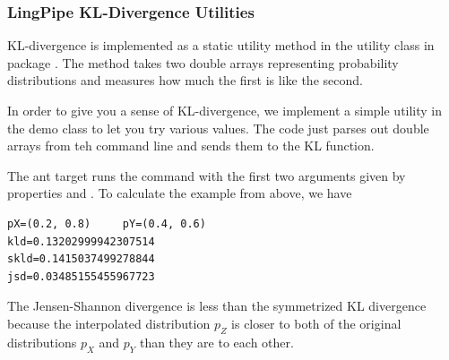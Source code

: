 \subsubsection{LingPipe KL-Divergence Utilities}

KL-divergence is implemented as a static utility method in the
 utility class in package .
The method takes two double arrays representing probability
distributions and measures how much the first is like the second.

In order to give you a sense of KL-divergence, we implement a simple
utility in the demo class  to let you try various
values.  The code just parses out double arrays from teh command line
and sends them to the KL function.
%

The ant target  runs the command with the first two arguments
given by properties  and .  To calculate the example
from above, we have
%
\begin{verbatim}
pX=(0.2, 0.8)     pY=(0.4, 0.6)     
kld=0.13202999942307514    
skld=0.1415037499278844   
jsd=0.03485155455967723
\end{verbatim}
%
The Jensen-Shannon divergence is less than the symmetrized KL
divergence because the interpolated distribution $p_Z$ is closer to
both of the original distributions $p_X$ and $p_Y$ than they are to
each other.


